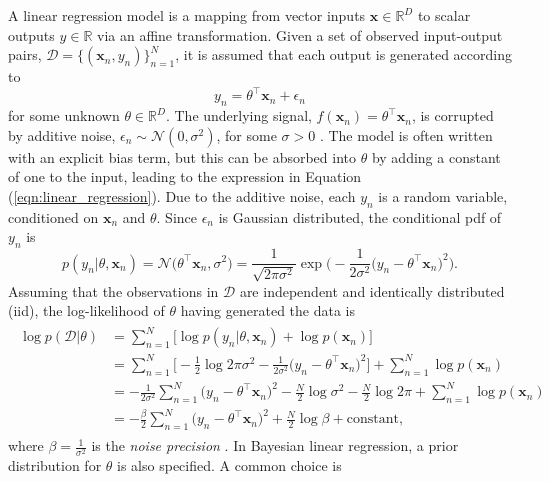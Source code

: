 \documentclass[msc,deptreport.inf]{infthesis} %
\newcommand{\matr}[1]{\mathbf{#1}}
\newcommand{\R}{\mathbb R}
\begin{document}
A linear regression model is a mapping from vector inputs $\matr{x} \in \R^D$ to scalar outputs $y \in \R$ via an affine transformation. Given a set of observed input-output pairs, $\mathcal{D} = \{(\matr{x}_n, y_n)\}_{n=1}^{N}$, it is assumed that each output is generated according to 
\begin{equation}\label{eqn:linear_regression}
	y_n = \theta^\intercal \matr{x}_n + \epsilon_n
\end{equation}
for some unknown $\theta \in \R^D$. The underlying signal, $f(\matr{x}_n) = \theta^\intercal \matr{x}_n$, is corrupted by additive noise, $\epsilon_n \sim \mathcal{N}(0, \sigma^2)$, for some $\sigma > 0$ \cite{barber2007}. The model is often written with an explicit bias term, but this can be absorbed into $\theta$ by adding a constant of one to the input, leading to the expression in Equation (\ref{eqn:linear_regression}). Due to the additive noise, each $y_n$ is a random variable, conditioned on $\matr{x}_n$ and $\theta$. Since $\epsilon_n$ is Gaussian distributed, the conditional pdf of $y_n$ is 
\begin{equation}\label{eqn:linear_regression_pdf}
	p(y_n | \theta, \matr{x}_n) 
	= \mathcal{N}\big(\theta^\intercal \matr{x}_n, \sigma^2\big)
	= \frac{1}{\sqrt{2\pi \sigma^2}} \exp\Big(-\frac{1}{2\sigma^2} \big(y_n - \theta^\intercal \matr{x}_n \big)^2\Big).
\end{equation}
Assuming that the observations in $\mathcal{D}$ are independent and identically distributed (iid), the log-likelihood of $\theta$ having generated the data is 
\begin{align}\label{eqn:linear_regression_log_likelihood}
\begin{split}
	\log p(\mathcal{D} | \theta) 
	& = \sum_{n=1}^N \big[ \log p(y_n | \theta, \matr{x}_n)  + \log p(\matr{x}_n) \big] \\
	& = \sum_{n=1}^N \Big[ -\frac{1}{2} \log 2\pi \sigma^2 - \frac{1}{2\sigma^2} \big(y_n - \theta^\intercal \matr{x}_n \big)^2 \Big]
	+ \sum_{n=1}^N \log p(\matr{x}_n) \\
	& = - \frac{1}{2 \sigma^2} \sum_{n=1}^N \big(y_n - \theta^\intercal \matr{x}_n \big)^2 
	- \frac{N}{2} \log \sigma^2
	- \frac{N}{2} \log 2\pi
	+ \sum_{n=1}^N \log p(\matr{x}_n) \\
	& = - \frac{\beta}{2} \sum_{n=1}^N \big(y_n - \theta^\intercal \matr{x}_n \big)^2 
	+ \frac{N}{2} \log \beta
	+ \text{constant},
\end{split}
\end{align}
where $\beta = \frac{1}{\sigma^2}$ is the \emph{noise precision} \cite{barber2007}. In Bayesian linear regression, a prior distribution for $\theta$ is also specified. A common choice  is 
\end{document}
